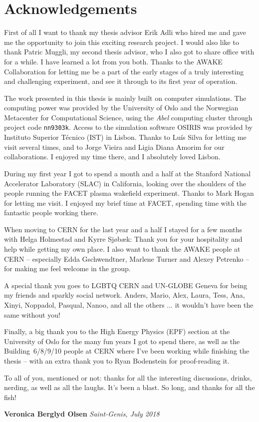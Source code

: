 \chapter*{Acknowledgements}

First of all I want to thank my thesis advisor Erik Adli who hired me and gave me the opportunity to join this exciting research project.
I would also like to thank Patric Muggli, my second thesis advisor, who I also got to share office with for a while.
I have learned a lot from you both.
Thanks to the AWAKE Collaboration for letting me be a part of the early stages of a truly interesting and challenging experiment, and see it through to its first year of operation.

The work presented in this thesis is mainly built on computer simulations.
The computing power was provided by the University of Oslo and the Norwegian Metacenter for Computational Science, using the \textit{Abel} computing cluster through project code \texttt{nn9303k}.
Access to the simulation software OSIRIS was provided by Instituto Superior Técnico (IST) in Lisbon.
Thanks to Luís Silva for letting me visit several times, and to Jorge Vieira and Ligia Diana Amorim for our collaborations.
I enjoyed my time there, and I absolutely loved Lisbon.

During my first year I got to spend a month and a half at the Stanford National Accelerator Laboratory (SLAC) in California, looking over the shoulders of the people running the FACET plasma wakefield experiment.
Thanks to Mark Hogan for letting me visit.
I enjoyed my brief time at FACET, spending time with the fantastic people working there.

When moving to CERN for the last year and a half I stayed for a few months with Helga Holmestad and Kyrre Sjøbæk:
Thank you for your hospitality and help while getting my own place.
I also want to thank the AWAKE people at CERN -- especially Edda Gschwendtner, Marlene Turner and Alexey Petrenko -- for making me feel welcome in the group.

A special thank you goes to LGBTQ CERN and UN-GLOBE Geneva for being my friends and sparkly social network.
Anders, Mario, Alex, Laura, Tess, Ana, Xinyi, Noppadol, Pasqual, Nanoo, and all the others ... it wouldn't have been the same without you!

Finally, a big thank you to the High Energy Physics (EPF) section at the University of Oslo for the many fun years I got to spend there, as well as the Building~6/8/9/10 people at CERN where I've been working while finishing the thesis -- with an extra thank you to Ryan Bodenstein for proof-reading it.

To all of you, mentioned or not: thanks for all the interesting discussions, drinks, nerding, as well as all the laughs.
It's been a blast.
So long, and thanks for all the fish!

\vfill
\null\hfill\textbf{Veronica Berglyd Olsen}
\newline
\null\hfill\textit{Saint-Genis, July 2018}
